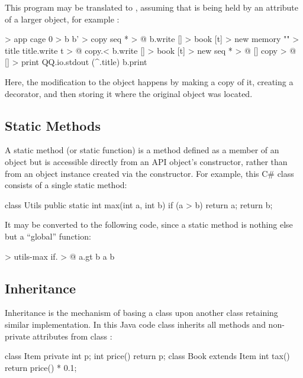 \documentclass[sigplan,nonacm]{acmart}
\begin{document}
This program may be translated to \eolang{}, assuming that  is being held by an attribute of a larger object, for example :

\begin{ffcode}
[] > app
  cage 0 > b
  b' > copy
  seq * > @
    b.write
      [] > book
        [t] > new
          memory "" > title
          title.write t > @
    copy.<
    b.write
      [] > book
        [t] > new
          seq * > @
            []
              copy > @
              [] > print
                QQ.io.stdout (^.title)
    b.print
\end{ffcode}

Here, the modification to the object  happens by making a copy of it, creating a decorator, and then storing it where the original object was located.

\subsection{Static Methods}
\label{sec:static}

A static method (or static function) is a method defined as a member of an object but is accessible directly from an API object's constructor, rather than from an object instance created via the constructor. For example, this C\# class consists of a single static method:

\begin{ffcode}
class Utils {
  public static int max(int a, int b) {
    if (a > b) return a;
    return b;
  }
}
\end{ffcode}

It may be converted to the following \eolang{} code, since a static method is nothing else but a ``global'' function:

\begin{ffcode}
[a b] > utils-max
  if. > @
    a.gt b
    a
    b
\end{ffcode}

\subsection{Inheritance}
\label{sec:inheritance}

Inheritance is the mechanism of basing a class upon another class retaining similar implementation. In this Java code class  inherits all methods and non-private attributes from class :

\begin{ffcode}
class Item {
  private int p;
  int price() { return p; }
}
class Book extends Item {
  int tax() { return price() * 0.1; }
}
\end{ffcode}
\end{document}
